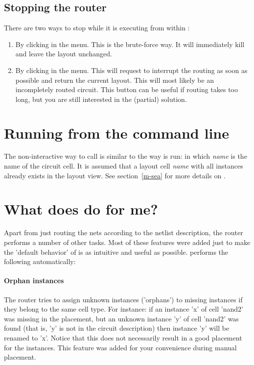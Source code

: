 \subsection{Stopping the router}
There are two ways to stop  while it is executing from
within :
\begin{enumerate}
\item
By clicking  in the menu. This is the brute-force way.
It will immediately kill  and leave the layout
unchanged.
\item
By clicking  in the menu. This will request
 to interrupt the routing as soon as possible and
return the current layout. This will most likely be an incompletely
routed circuit. This button can be useful if routing takes too
long, but you are still interested in the (partial) solution.
\end{enumerate}

\section{Running \protect{} from the command line}
The non-interactive way to call  is similar to the way
 is run:  in which {\sl name} is 
the name of the circuit cell. It is assumed that a layout cell {\sl name}
with all instances already exists in the layout view. See
section~\ref{m-sea} for more details on .

\section{What does \protect{} do for me?}
Apart from just routing the nets according to the netlist description, the
router performs a number of other tasks. Most of these features were added just
to make the 'default behavior' of  is as intuitive and useful as
possible.  performs the following automatically:
\paragraph{Orphan instances}
The router tries to assign unknown instances ('orphans') to missing instances
if they belong to the same cell type.  For instance: if an instance 'x' of
cell 'nand2' was missing in the placement, but an unknown instance 'y' of cell
'nand2' was found (that is, 'y' is not in the circuit description) then
instance 'y' will be renamed to 'x'. Notice that this does not necessarily
result in a good placement for the instances.  This feature was added for your
convenience during manual placement.
